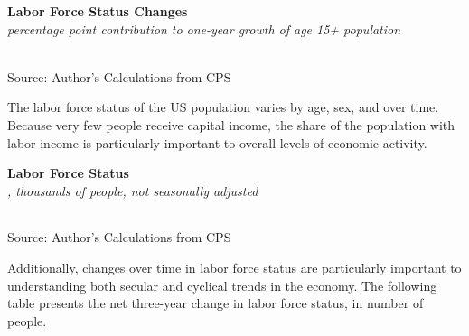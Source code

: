 \documentclass{report}
\makeatletter
\newcommand{\tbllink}[1]{\href{https://raw.githubusercontent.com/bdecon/US-chartbook/master/chartbook/data/#1}{\faTable}}
\newcommand*\short[1]{\expandafter\@gobbletwo\number\numexpr#1\relax}
\newcommand{\ctsbar}[5]{
		\addplot[ybar stacked, bar width=#5, draw opacity=0, fill=#1] 
			table [x=#2, y=#3, col sep=comma]{#4};}
\newcommand{\dateaxisticks}{
		date coordinates in=x, axis line style={draw=none},
		xmax={2023-02-15},
		max space between ticks=40,	    
		xtick={{1990-01-01}, {1992-01-01}, {1994-01-01}, 
			{1996-01-01}, {1998-01-01}, {2000-01-01}, 
			{2002-01-01}, {2004-01-01}, {2006-01-01},
			{2008-01-01}, {2010-01-01}, {2012-01-01}, {2014-01-01},
		    {2016-01-01}, {2018-01-01}, {2020-01-01}, {2022-01-01}, 
		    {2024-01-01}, {2026-01-01}},
		minor xtick={{1989-01-01}, {1991-01-01}, {1993-01-01},
			{1995-01-01}, {1997-01-01}, {1999-01-01}, 
			{2001-01-01}, {2003-01-01}, {2005-01-01}, {2007-01-01},
		    {2009-01-01}, {2011-01-01}, {2013-01-01}, {2015-01-01},
		    {2017-01-01}, {2019-01-01}, {2021-01-01}, {2023-01-01}, 
		    {2025-01-01}, {2027-01-01}},
		enlarge y limits={0.06}, enlarge x limits={0.01},
		}
\newcommand{\bbar}[2]{extra #1 ticks = {{#2}}, extra #1 tick labels = ,
		extra #1 tick style = {grid=major, grid style={thick, black!25}},}
\newcommand{\rbars}{
		\fill[color=black!10] (axis cs:{1990-07-01},\pgfkeysvalueof{/pgfplots/ymin}) rectangle 
			(axis cs:{1991-03-01}, \pgfkeysvalueof{/pgfplots/ymax});
		\fill[color=black!10] (axis cs:{2007-12-01},\pgfkeysvalueof{/pgfplots/ymin}) rectangle 
			(axis cs:{2009-07-01}, \pgfkeysvalueof{/pgfplots/ymax});
		\fill[color=black!10] (axis cs:{2001-03-01},\pgfkeysvalueof{/pgfplots/ymin}) rectangle 
			(axis cs:{2001-11-01}, \pgfkeysvalueof{/pgfplots/ymax});
		\fill[color=black!10] (axis cs:{2020-02-01},\pgfkeysvalueof{/pgfplots/ymin}) rectangle 
			(axis cs:{2020-05-01}, \pgfkeysvalueof{/pgfplots/ymax});}
\makeatother
\begin{document}
{\begin{minipage}{0.76\textwidth}
\normalsize \textbf{Labor Force Status Changes}\\
\footnotesize{\textit{percentage point contribution to one-year growth of age 15+ population}}\\
\hspace*{-2mm} \\
\footnotesize{Source: Author's Calculations from CPS} \hfill \tbllink{cps_lfs2.csv}
\end{minipage}
\newpage
\begin{minipage}{0.76\textwidth}
\small The labor force status of the US population varies by age, sex, and over time. Because very few people receive capital income, the share of the population with labor income is particularly important to overall levels of economic activity. 
\vspace{2mm}

\normalsize \textbf{Labor Force Status}\\
\footnotesize{\textit{\unskip, thousands of people, not seasonally adjusted}}\\
\noindent {} \setlength{\tabcolsep}{3.0pt} \color{black!90}
		{\renewcommand{\arraystretch}{1.52}
		 \begin{tabular}{p{27.8mm} R{11.2mm} R{10.4mm} R{10.4mm} R{10.2mm} 
		 				 R{10.6mm} R{10.4mm} R{10.4mm}}
			  \hline
		\end{tabular}}
\vspace{-2mm}	
	
\footnotesize{Source: Author's Calculations from CPS}
\vspace{4mm}

\small Additionally, changes over time in labor force status are particularly important to understanding both secular and cyclical trends in the economy. The following table presents the net three-year change in labor force status, in number of people.
\vspace{2mm}


\end{minipage}}
\end{document}
